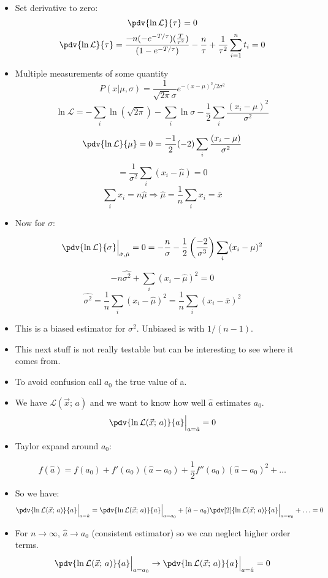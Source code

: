 \begin{itemize}
    \item Set derivative to zero:
          \[ \pdv{\ln \mathcal{L}}{\tau} = 0 \]
          \[ \pdv{\ln \mathcal{L}}{\tau} = \frac{-n (-e^{-T/\tau}) (\frac{T}{\tau^2})}{(1-e^{-T/\tau})} - \frac{n}{\tau} + \frac{1}{\tau^2} \sum_{i=1}^n t_i = 0 \]

    \item Multiple measurements of some quantity
          \[ P(x | \mu, \sigma) = \frac{1}{\sqrt{2 \pi} \sigma} e^{-(x - \mu)^2 / 2 \sigma^2} \]
          \[ \ln \mathcal{L} = - \sum_i \ln (\sqrt{2 \pi}) - \sum_i \ln \sigma - \frac{1}{2} \sum_i \frac{(x_i - \mu)^2}{\sigma^2} \]

          \[ \pdv{\ln \mathcal{L}}{\mu} = 0 = \frac{-1}{2} (-2) \sum_i \frac{(x_i - \mu)}{\sigma^2} \]
          \[ = \frac{1}{\sigma^2}  \sum_i (x_i - \hat{\mu}) = 0 \]
          \[ \sum_i x_i = n \hat{\mu} \Rightarrow \hat{\mu} = \frac{1}{n} \sum_i x_i = \bar{x} \]
    \item Now for $\sigma$:

          \[ \pdv{\ln \mathcal{L}}{\sigma}\Big|_{\hat{\sigma}, \hat{\mu}} = 0 = -\frac{n}{\sigma}- \frac{1}{2} \left(\frac{-2}{\sigma^3} \right) \sum_i (x_i - \mu)^2\]

          \[ -n \hat{\sigma^2} + \sum_i (x_i - \hat{\mu})^2 = 0 \]
          \[ \hat{\sigma^2} = \frac{1}{n} \sum_i (x_i - \hat{\mu})^2  = \frac{1}{n} \sum_i (x_i - \bar{x})^2 \]
    \item This is a biased estimator for $\sigma^2$. Unbiased is with $1/(n-1)$.

    \item This next stuff is not really testable but can be interesting to see where it comes from.

    \item To avoid confusion call $a_0$ the true value of a.
    \item We have $\mathcal{L}(\vec{x}; \, a)$ and we want to know how well $\hat{a}$ estimates $a_0$.
          \[ \pdv{\ln \mathcal{L}(\vec{x}; \, a)}{a} \Big|_{a = \hat{a}} = 0 \]
    \item Taylor expand around $a_0$:

          \[ f(\hat{a}) = f(a_0) + f'(a_0) (\hat{a} - a_0) + \frac{1}{2} f''(a_0) (\hat{a} - a_0)^2 + \ldots \]
    \item So we have:
          \[ \pdv{\ln \mathcal{L}(\vec{x}; \, a)}{a} \Big|_{a = \hat{a}} = \pdv{\ln \mathcal{L}(\vec{x}; \, a)}{a} \Big|_{a = a_0} + (\hat{a} - a_0) \pdv[2]{\ln \mathcal{L}(\vec{x}; \, a)}{a} \Big|_{a = a_0} + \ldots = 0 \]
    \item For $n\rightarrow \infty$, $\hat{a} \rightarrow a_0$ (consistent estimator) so we can neglect higher order terms.
          \[ \pdv{\ln \mathcal{L}(\vec{x}; \, a)}{a} \Big|_{a = a_0} \rightarrow \pdv{\ln \mathcal{L}(\vec{x}; \, a)}{a} \Big|_{a = \hat{a}} = 0 \]
\end{itemize}